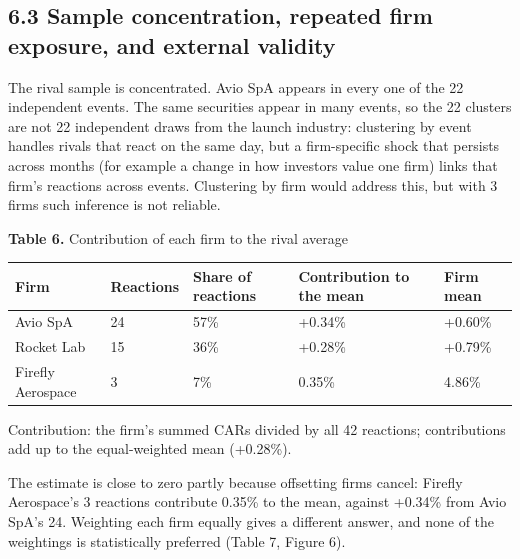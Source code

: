 \documentclass[12pt,a4paper]{article}
\begin{document}
\subsection*{6.3 Sample concentration, repeated firm exposure, and external validity}
The rival sample is concentrated. Avio SpA appears in every one of the 22 independent events. The same securities appear in many events, so the 22 clusters are not 22 independent draws from the launch industry: clustering by event handles rivals that react on the same day, but a firm-specific shock that persists across months (for example a change in how investors value one firm) links that firm's reactions across events. Clustering by firm would address this, but with 3 firms such inference is not reliable.

\par\noindent\begin{minipage}{\textwidth}
\textbf{Table 6.} Contribution of each firm to the rival average

{\small\setlength{\tabcolsep}{4pt}\begin{tabularx}{\textwidth}{lllXl}
\toprule
\textbf{Firm} & \textbf{Reactions} & \textbf{Share of reactions} & \textbf{Contribution to the mean} & \textbf{Firm mean} \\
\midrule
Avio SpA & 24 & 57\% & +0.34\% & +0.60\% \\
Rocket Lab & 15 & 36\% & +0.28\% & +0.79\% \\
Firefly Aerospace & 3 & 7\% & \textminus{}0.35\% & \textminus{}4.86\% \\
\bottomrule
\end{tabularx}}
\vspace{6pt}

Contribution: the firm's summed CARs divided by all 42 reactions; contributions add up to the equal-weighted mean (+0.28\%).

\end{minipage}\par\vspace{4pt}

The estimate is close to zero partly because offsetting firms cancel: Firefly Aerospace's 3 reactions contribute \textminus{}0.35\% to the mean, against +0.34\% from Avio SpA's 24. Weighting each firm equally gives a different answer, and none of the weightings is statistically preferred (Table 7, Figure 6).
\end{document}
